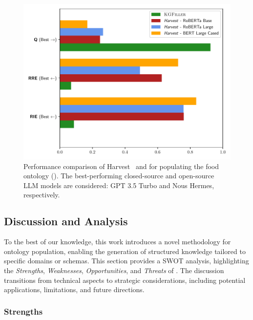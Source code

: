 \begin{figure}
    \centering
    \includegraphics[width=\linewidth]{figures/kgfiller/comparison}
    \caption[Performance Comparison of Harvest and \llmfkg{}]{
        Performance comparison of Harvest~\cite{HaoTTNSZXH23} and \llmfkg{} for populating the food ontology ().
        The best-performing closed-source and open-source \gls{LLM} models are considered: GPT 3.5 Turbo and Nous Hermes, respectively.
    }
    \label{fig:compare-performance}
\end{figure}



\subsection{Discussion and  Analysis}
\label{subsec:discussion}

To the best of our knowledge, this work introduces a novel methodology for ontology population, enabling the generation of structured knowledge tailored to specific domains or schemas.
%
This section provides a \gls{SWOT} analysis, highlighting the \textit{Strengths}, \textit{Weaknesses}, \textit{Opportunities}, and \textit{Threats} of \llmfkg{}.
%
The discussion transitions from technical aspects to strategic considerations, including potential applications, limitations, and future directions.

\subsubsection{Strengths}
\label{subsubsec:strengths}

